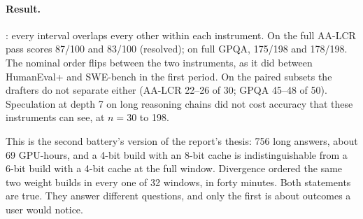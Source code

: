 \begin{table}[t]
\centering\small
\caption{AA-LCR judging. The same 260 answers were scored by two independent LLM judges using the
benchmark's equality-checker prompt; a third judge ruled on the 11 disagreements. Identifiers are as
recorded in the artifacts.}\label{tab:judges}
\end{table}

\paragraph{Result.} : every interval overlaps every other within each instrument.
On the full AA-LCR pass \Qfour{} scores 87/100 and \Qsix{} 83/100 (resolved); on full GPQA, 175/198 and
178/198. The nominal order flips between the two instruments, as it did between HumanEval+ and
SWE-bench in the first period. On the paired subsets the drafters do not separate either (AA-LCR
22--26 of 30; GPQA 45--48 of 50). Speculation at depth 7 on long reasoning chains did not cost
accuracy that these instruments can see, at $n=30$ to 198.

This is the second battery's version of the report's thesis: 756 long answers, about 69 GPU-hours,
and a 4-bit build with an 8-bit cache is indistinguishable from a 6-bit build with a 4-bit cache at
the full window. Divergence ordered the same two weight builds in every one of 32 windows, in forty minutes.
Both statements are true. They answer different questions, and only the first is about outcomes a
user would notice.

